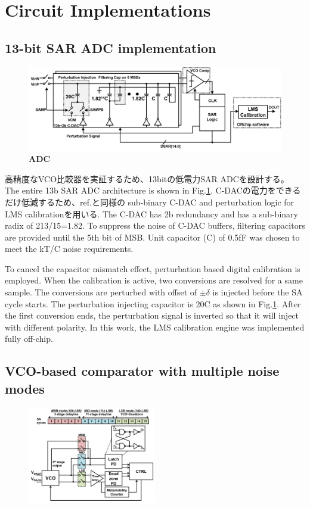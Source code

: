 \documentclass[letterpaper, 10 pt, conference]{ieeeconf}  %
\begin{document}
\section{Circuit Implementations}
\subsection{13-bit SAR ADC implementation}

\begin{figure}[ht!]
\centering
 \includegraphics[width=1\textwidth]{figs/fig7.png}
  \captionsetup{font=footnotesize}
  \caption{\textbf{ADC}}
  \label{13bsar}
\end{figure}

高精度なVCO比較器を実証するため、13bitの低電力SAR ADCを設計する。
The entire 13b SAR ADC architecture is shown in Fig.\ref{13bsar}. C-DACの電力をできるだけ低減するため、ref.\cite{liu201012b}と同様の sub-binary C-DAC and perturbation logic for LMS calibrationを用いる. The C-DAC has 2b redundancy and has a sub-binary radix of 213/15=1.82. To suppress the noise of C-DAC buffers, filtering capacitors \cite{miki20154} are provided until the 5th bit of MSB. Unit capacitor (C) of 0.5fF was chosen  to meet the kT/C noise requirements.

To cancel the capacitor mismatch effect, perturbation based digital calibration \cite{liu201012b} is employed. When the calibration is active, two conversions are resolved for a same sample. The conversions are perturbed with offset of $\pm \delta$ is injected before the SA cycle starts. The perturbation injecting capacitor is 20C as shown in Fig.\ref{13bsar}. After the first conversion ends, the perturbation signal is inverted so that it will inject with different polarity. In this work, the LMS calibration engine was implemented fully off-chip.

\subsection{VCO-based comparator with multiple noise modes}
\begin{figure}[ht!]
\centering
 \includegraphics[width=0.5\textwidth]{figs/vco-entire.png}
  \label{fullvco}
\end{figure}
\end{document}
